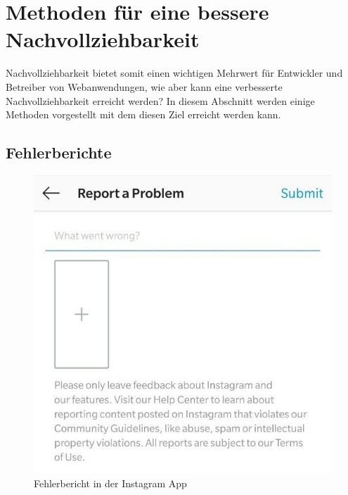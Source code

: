 

\section{Methoden für eine bessere Nachvollziehbarkeit}
\label{sec:methoden}

Nachvollziehbarkeit bietet somit einen wichtigen Mehrwert für Entwickler und Betreiber von Webanwendungen, wie aber kann eine verbesserte Nachvollziehbarkeit erreicht werden? In diesem Abschnitt werden einige Methoden vorgestellt mit dem diesen Ziel erreicht werden kann.

\subsection{Fehlerberichte}

\begin{figure}
\centering
\includegraphics[width=\linewidth]{img/instagram-feedback/instagram-feedback.jpg}
\caption{Fehlerbericht in der Instagram App \cite{Instagram}}
\label{fig:instagram-bug-report}
\end{figure}

